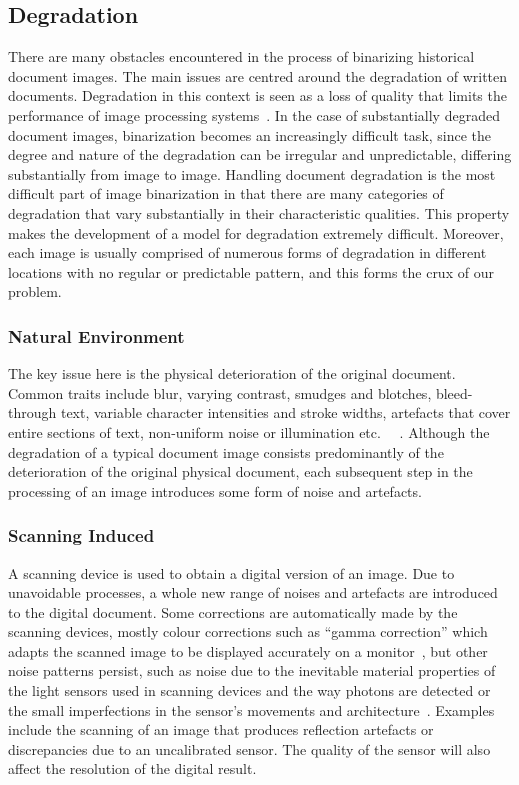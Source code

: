 \documentclass[a4paper, 12pt]{report}
\begin{document}
\subsection{Degradation}
There are many obstacles encountered in the process of binarizing historical document images. The main issues are centred around the degradation of written documents. Degradation in this context is seen as a loss of quality that limits the performance of image processing systems~\cite{Baird2007}. In the case of substantially degraded document images, binarization becomes an increasingly difficult task, since the degree and nature of the degradation can be irregular and unpredictable, differing substantially from image to image. Handling document degradation is the most difficult part of image binarization in that there are many categories of degradation that vary substantially in their characteristic qualities. This property makes the development of a model for degradation extremely difficult. Moreover, each image is usually comprised of numerous forms of degradation in different locations with no regular or predictable pattern, and this forms the crux of our problem.

\subsubsection{Natural Environment}
The key issue here is the physical deterioration of the original document. Common traits include blur, varying contrast, smudges and blotches, bleed-through text, variable character intensities and stroke widths, artefacts that cover entire sections of text, non-uniform noise or illumination etc.~\cite{gatos2006adaptive} ~\cite{ait2022innovative}. Although the degradation of a typical document image consists predominantly of the deterioration of the original physical document, each subsequent step in the processing of an image introduces some form of noise and artefacts.

\subsubsection{Scanning Induced}
A scanning device is used to obtain a digital version of an image. Due to unavoidable processes, a whole new range of noises and artefacts are introduced to the digital document. Some corrections are automatically made by the scanning devices, mostly colour corrections such as “gamma correction” which adapts the scanned image to be displayed accurately on a monitor~\cite{smoaca2011id}, but other noise patterns persist, such as noise due to the inevitable material properties of the light sensors used in scanning devices and the way photons are detected or the small imperfections in the sensor’s movements and architecture~\cite{smoaca2011id}. Examples include the scanning of an image that produces reflection artefacts or discrepancies due to an uncalibrated sensor. The quality of the sensor will also affect the resolution of the digital result.\par
\end{document}
